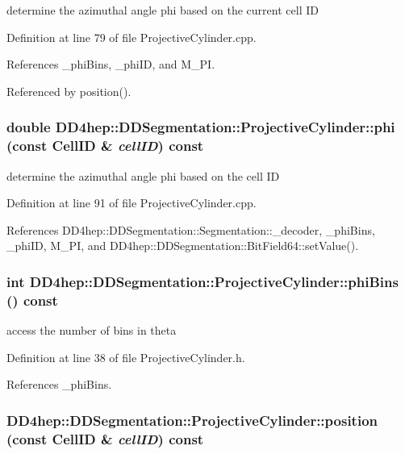 determine the azimuthal angle phi based on the current cell ID 

Definition at line 79 of file ProjectiveCylinder.cpp.

References \_\-phiBins, \_\-phiID, and M\_\-PI.

Referenced by position().\hypertarget{class_d_d4hep_1_1_d_d_segmentation_1_1_projective_cylinder_a249b8bf6a54b6a229332bc838d8abb41}{
\subsubsection[{phi}]{\setlength{\rightskip}{0pt plus 5cm}double DD4hep::DDSegmentation::ProjectiveCylinder::phi (const {\bf CellID} \& {\em cellID}) const}}
\label{class_d_d4hep_1_1_d_d_segmentation_1_1_projective_cylinder_a249b8bf6a54b6a229332bc838d8abb41}


determine the azimuthal angle phi based on the cell ID 

Definition at line 91 of file ProjectiveCylinder.cpp.

References DD4hep::DDSegmentation::Segmentation::\_\-decoder, \_\-phiBins, \_\-phiID, M\_\-PI, and DD4hep::DDSegmentation::BitField64::setValue().\hypertarget{class_d_d4hep_1_1_d_d_segmentation_1_1_projective_cylinder_acc41ce3d5dce7032b0985762f19605c6}{
\subsubsection[{phiBins}]{\setlength{\rightskip}{0pt plus 5cm}int DD4hep::DDSegmentation::ProjectiveCylinder::phiBins () const}}
\label{class_d_d4hep_1_1_d_d_segmentation_1_1_projective_cylinder_acc41ce3d5dce7032b0985762f19605c6}


access the number of bins in theta 

Definition at line 38 of file ProjectiveCylinder.h.

References \_\-phiBins.\hypertarget{class_d_d4hep_1_1_d_d_segmentation_1_1_projective_cylinder_a4108a130ccc4573d4204318e975ad8bf}{
\subsubsection[{position}]{ DD4hep::DDSegmentation::ProjectiveCylinder::position (const {\bf CellID} \& {\em cellID}) const}}
\label{class_d_d4hep_1_1_d_d_segmentation_1_1_projective_cylinder_a4108a130ccc4573d4204318e975ad8bf}


